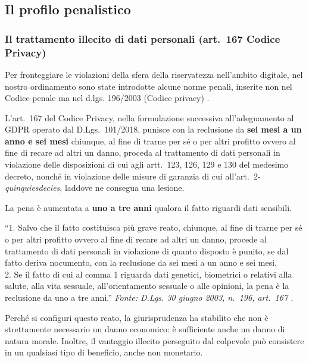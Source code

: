 \documentclass[12pt, a4paper]{article}
\begin{document}
\subsection{Il profilo penalistico}
\label{sub:penale}

\subsubsection{Il trattamento illecito di dati personali (art.~167 Codice Privacy)}
\label{subsub:art167}

Per fronteggiare le violazioni della sfera
della riservatezza nell'ambito digitale, nel nostro ordinamento sono
state introdotte alcune norme penali, inserite non nel Codice penale ma nel
d.lgs. 196/2003 (Codice privacy)
\autocite[p.~38, \S~2.7]{pietropaoli2022}.

L'art.~167 del Codice Privacy, nella formulazione successiva all'adeguamento
al GDPR operato dal D.Lgs.~101/2018, punisce con la reclusione da
\textbf{sei mesi a un anno e sei mesi} chiunque, al fine di trarne per sé o
per altri profitto ovvero al fine di recare ad altri un danno, proceda al
trattamento di dati personali in violazione delle disposizioni di cui agli
artt.~123, 126, 129 e 130 del medesimo decreto, nonché in violazione
delle misure di garanzia di cui all'art.~2-\emph{quinquiesdecies}, laddove ne consegua una lesione.

La pena è aumentata a \textbf{uno a tre anni} qualora il fatto riguardi
dati sensibili.

\begin{normabox}
  \small
  ``1. Salvo che il fatto costituisca più grave reato, chiunque, al fine di
  trarne per sé o per altri profitto ovvero al fine di recare ad altri un danno,
  procede al trattamento di dati personali in violazione di quanto disposto
  \textelp{} è punito, se dal fatto deriva nocumento, con la reclusione da sei
  mesi a un anno e sei mesi. \\
  2. Se il fatto di cui al comma 1 riguarda dati
  genetici, biometrici o relativi alla salute, alla vita sessuale, all'orientamento
  sessuale o alle opinioni, \textelp{} la pena è la reclusione da uno a tre anni.''
  \newline
  {\scriptsize \textit{Fonte: D.Lgs. 30 giugno 2003, n.~196, art.~167
  \autocite{codiceprivacy2003}.}}
\end{normabox}

Perché si configuri questo reato, la giurisprudenza ha stabilito che non è strettamente necessario 
un danno economico: è sufficiente anche un danno di natura morale. Inoltre, il vantaggio illecito 
perseguito dal colpevole può consistere in un qualsiasi tipo di beneficio, anche non monetario.
\end{document}
